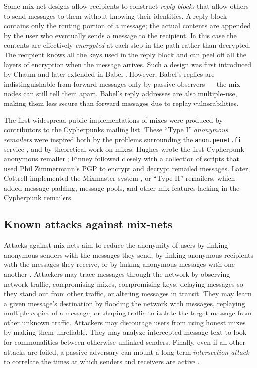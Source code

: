 \documentclass[final,inpress,inline]{ieee}
\begin{document}
Some mix-net designs allow recipients to construct \emph{reply blocks}
that allow others to send messages to them without knowing their
identities. A reply block contains only the routing portion of a message;
the actual contents are appended by the user who eventually sends a
message to the recipient. In this case the contents are effectively
\emph{encrypted} at each step in the path rather than decrypted.
The recipient knows all the keys used in the reply block and can peel
off all the layers of encryption when the message arrives. Such a design
was first introduced by Chaum \cite{chaum-mix} and later extended in
Babel \cite{babel}. However, Babel's replies are indistinguishable from
forward messages only by passive observers --- the mix nodes can still
tell them apart. Babel's reply addresses are also multiple-use, making them
less secure than forward messages due to replay vulnerabilities.

The first widespread public implementations of mixes were produced by
contributors to the Cypherpunks mailing list. These ``Type I''
\emph{anonymous remailers} 
were inspired both by the problems surrounding the {\tt anon.penet.fi}
service \cite{helsingius}, and by theoretical work on mixes. Hughes
wrote the first Cypherpunk anonymous remailer \cite{remailer-history};
Finney followed closely with a collection of scripts that used Phil
Zimmermann's PGP to encrypt and decrypt remailed messages. Later, Cottrell
implemented the Mixmaster system \cite{mixmaster-attacks}\cite{mixmaster-spec},
or ``Type II'' remailers, which added message padding, message pools,
and other mix features lacking in the Cypherpunk remailers.

\subsection{Known attacks against mix-nets}

Attacks against mix-nets aim to reduce the anonymity of users by
linking anonymous senders with the messages they send, by linking
anonymous recipients with the messages they receive, or by linking
anonymous messages with one another \cite{raymond00}.  Attackers may
trace messages through the network by observing network
traffic, compromising mixes, compromising keys, delaying messages
so they stand out from other traffic, or altering messages
in transit.  They may learn a given message's destination
by flooding the network with messages, replaying multiple copies
of a message, or shaping traffic to isolate the target message from
other unknown traffic. Attackers may discourage users from
using honest mixes by making them unreliable. They may analyze
intercepted message text to look for commonalities between otherwise
unlinked senders.
Finally, even if all other attacks are foiled, a passive adversary can
mount a long-term \emph{intersection attack} to correlate the times at
which senders and receivers are active \cite{disad-free-routes}.
\end{document}

